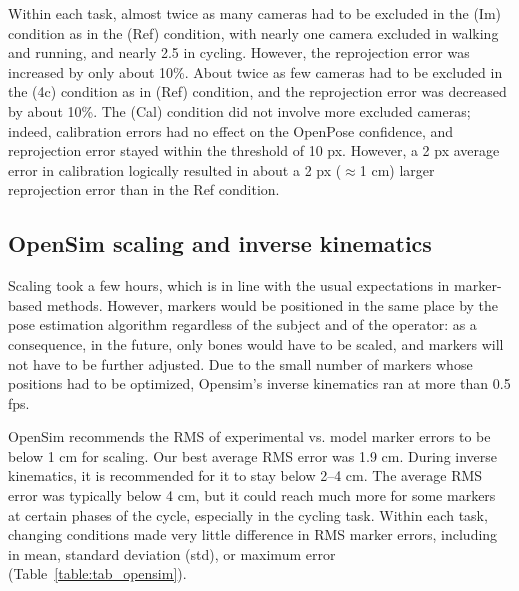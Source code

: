
Within each task, almost twice as many cameras had to be excluded in the (Im) condition as in the (Ref) condition, with nearly one camera excluded in walking and running, and nearly 2.5 in cycling. However, the reprojection error was increased by only about 10\%. About twice as few cameras had to be excluded in the (4c) condition as in (Ref) condition, and the reprojection error was decreased by about 10\%. The (Cal) condition did not involve more excluded cameras; indeed, calibration errors had no effect on the OpenPose confidence, and reprojection error stayed within the threshold of 10 px. However, a 2 px average error in calibration logically resulted in about a 2 px ($\approx$1 cm) larger reprojection error than in the Ref condition.


\subsection{OpenSim scaling and inverse kinematics}

Scaling took a few hours, which is in line with the usual expectations in marker-based methods. However, markers would be positioned in the same place by the pose estimation algorithm regardless of the subject and of the operator: as a consequence, in the future, only bones would have to be scaled, and markers will not have to be further adjusted. Due to the small number of markers whose positions had to be optimized, Opensim’s inverse kinematics ran at more than 0.5 fps.

OpenSim recommends the RMS of experimental vs. model marker errors to be below 1 cm for scaling. Our best average RMS error was 1.9 cm. During inverse kinematics, it is recommended for it to stay below 2–4 cm. The average RMS error was typically below 4 cm, but it could reach much more for some markers at certain phases of the cycle, especially in the cycling task. Within each task, changing conditions made very little difference in RMS marker errors, including in mean, standard deviation (std), or maximum error (Table~\ref{table:tab_opensim}).

